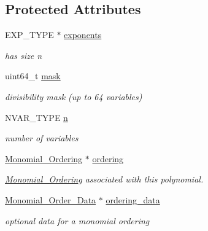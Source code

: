 \subsection*{Protected Attributes}
\begin{DoxyCompactItemize}
\item 
\mbox{\label{class_monomial_aa9f256d751e5b6cbd08c191776a28a00}} 
E\+X\+P\+\_\+\+T\+Y\+PE $\ast$ \hyperlink{class_monomial_aa9f256d751e5b6cbd08c191776a28a00}{exponents}
\begin{DoxyCompactList}\small\item\em has size n \end{DoxyCompactList}\item 
\mbox{\label{class_monomial_a4604f87abf09804a494bd6f92aa46453}} 
uint64\+\_\+t \hyperlink{class_monomial_a4604f87abf09804a494bd6f92aa46453}{mask}
\begin{DoxyCompactList}\small\item\em divisibility mask (up to 64 variables) \end{DoxyCompactList}\item 
\mbox{\label{class_monomial_a5c874cbc4af0c5a5b43afd0adb176156}} 
N\+V\+A\+R\+\_\+\+T\+Y\+PE \hyperlink{class_monomial_a5c874cbc4af0c5a5b43afd0adb176156}{n}
\begin{DoxyCompactList}\small\item\em number of variables \end{DoxyCompactList}\item 
\mbox{\label{class_monomial_a334ac290604c0199ed97265efe245db5}} 
\hyperlink{class_monomial___ordering}{Monomial\+\_\+\+Ordering} $\ast$ \hyperlink{class_monomial_a334ac290604c0199ed97265efe245db5}{ordering}
\begin{DoxyCompactList}\small\item\em \hyperlink{class_monomial___ordering}{Monomial\+\_\+\+Ordering} associated with this polynomial. \end{DoxyCompactList}\item 
\mbox{\label{class_monomial_ae91138ece28b35404366c1a47e283034}} 
\hyperlink{class_monomial___order___data}{Monomial\+\_\+\+Order\+\_\+\+Data} $\ast$ \hyperlink{class_monomial_ae91138ece28b35404366c1a47e283034}{ordering\+\_\+data}
\begin{DoxyCompactList}\small\item\em optional data for a monomial ordering \end{DoxyCompactList}\end{DoxyCompactItemize}
